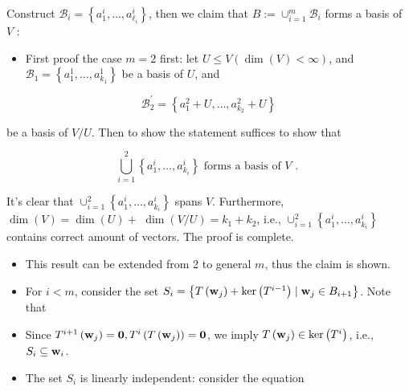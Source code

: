 \documentclass[11pt]{article}
\begin{document}
Construct \({\mathcal{B}}_{i} = \left\{  {{a}_1^{i},\ldots ,{a}_{{\ell }_{i}}^{i}}\right\}\), then we claim that \(B \mathrel{\text{ := }} { \cup  }_{i = 1}^{m}{\mathcal{B}}_{i}\) forms a basis of \(V\) :

\begin{itemize}
\item First proof the case \(m = 2\) first: let \(U \leq  V\left( {\dim \left( V\right)  < \infty }\right)\), and \({\mathcal{B}}_1 = \left\{  {{a}_1^1,\ldots ,{a}_{{k}_1}^1}\right\}\) be a basis of \(U\), and
\end{itemize}

\[
{\mathcal{B}}_2^{\prime } = \left\{  {{a}_1^2 + U,\ldots ,{a}_{{k}_2}^2 + U}\right\}
\]

be a basis of \(V/U\). Then to show the statement suffices to show that

\[
\mathop{\bigcup }\limits_{{i = 1}}^2\left\{  {{a}_1^{i},\ldots ,{a}_{{k}_{i}}^{i}}\right\}  \text{ forms a basis of }V\text{ . }
\]

It’s clear that \({ \cup  }_{i = 1}^2\left\{  {{a}_1^{i},\ldots ,{a}_{{k}_{i}}^{i}}\right\}\) spans \(V\). Furthermore, \(\dim \left( V\right)  = \dim \left( U\right)  +\)  \(\dim \left( {V/U}\right)  = {k}_1 + {k}_2\), i.e., \({ \cup  }_{i = 1}^2\left\{  {{a}_1^{i},\ldots ,{a}_{{k}_{i}}^{i}}\right\}\) contains correct amount of vectors. The proof is complete.

\begin{itemize}
\item This result can be extended from 2 to general \(m\), thus the claim is shown.
\end{itemize}

\begin{itemize}
\item For \(i < m\), consider the set \({S}_{i} = \left\{  {T\left( {\bf w}_{j}\right)  + \ker \left( {T}^{i - 1}\right)  \mid  {\bf w}_{j} \in  {B}_{i + 1}}\right\}\). Note that
\end{itemize}

\begin{itemize}
\item Since \({T}^{i + 1}\left( {\bf w}_{j}\right)  = \mathbf{0},{T}^{i}\left( {T\left( {\bf w}_{j}\right) }\right)  = \mathbf{0}\), we imply \(T\left( {\bf w}_{j}\right)  \in  \ker \left( {T}^{i}\right)\), i.e., \({S}_{i} \subseteq  {\bf w}_{i}\).
\end{itemize}

\begin{itemize}
\item The set \({S}_{i}\) is linearly independent: consider the equation
\end{itemize}
\end{document}
